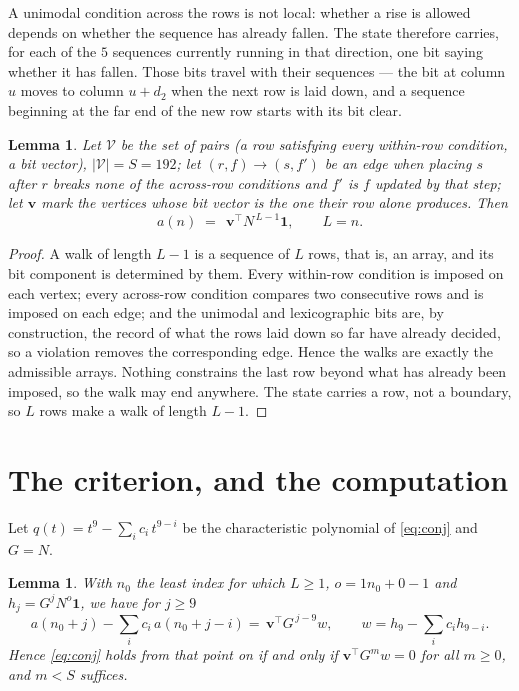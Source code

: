 \documentclass[11pt,a4paper]{article}
\theoremstyle{plain}
\newtheorem{lemma}[theorem]{Lemma}
\theoremstyle{definition}
\begin{document}
A unimodal condition across the rows is not local: whether a
rise is allowed depends on whether the sequence has already fallen. The state therefore
carries, for each of the $5$ sequences currently running in that direction, one bit saying
whether it has fallen. Those bits travel with their sequences --- the bit at column $u$
moves to column $u+d_2$ when the next row is laid down, and a sequence beginning at the
far end of the new row starts with its bit clear.

\begin{lemma}\label{lem:walk}
Let $\mathcal V$ be the set of pairs (a row satisfying every within-row condition, a
bit vector), $|\mathcal V|=S=192$; let $(r,f)\to(s,f')$ be an edge when placing $s$ after $r$
breaks none of the across-row conditions and $f'$ is $f$ updated by that step; let
$\mathbf{v}$ mark the vertices whose bit vector is the one their row alone produces.
Then
\[
a(n)\;=\;\,\mathbf{v}^{\!\top}N^{\,L-1}\mathbf{1},\qquad L=n.
\]
\end{lemma}

\begin{proof}
A walk of length $L-1$ is a sequence of $L$ rows, that is, an array, and its bit component
is determined by them. Every within-row condition is imposed on each vertex; every
across-row condition compares two consecutive rows and is imposed on each edge; and the
unimodal and lexicographic bits are, by construction, the record of what the rows laid down
so far have already decided, so a violation removes the corresponding edge. Hence the walks
are exactly the admissible arrays. Nothing constrains the last row beyond what has already
been imposed, so the walk may end anywhere. The state carries a row, not a boundary, so
$L$ rows make a walk of length $L-1$.
\end{proof}

\section{The criterion, and the computation}

Let $q(t)=t^{9}-\sum_i c_i\,t^{9-i}$ be the characteristic polynomial of
\eqref{eq:conj} and $G=N$.

\begin{lemma}\label{lem:crit}
With $n_0$ the least index for which $L\ge1$, $o=1n_0+0-1$ and
$h_j=G^{j}N^{o}\mathbf{1}$, we have for $j\ge9$
\[
a(n_0+j)-\sum_i c_i\,a(n_0+j-i)=\,\mathbf{v}^{\!\top}G^{\,j-9}w,
\qquad w=h_{9}-\sum_i c_ih_{9-i} .
\]
Hence \eqref{eq:conj} holds from that point on if and only if
$\mathbf{v}^{\!\top}G^{m}w=0$ for all $m\ge0$, and $m<S$ suffices.
\end{lemma}
\end{document}
